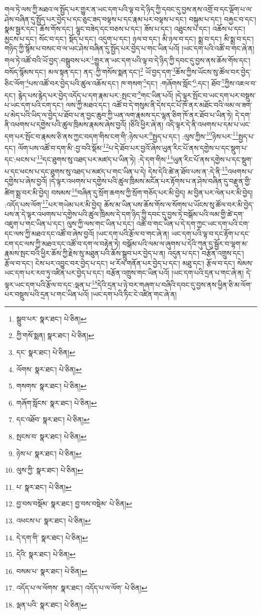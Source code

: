 གལ་ཏེ་ལས་ཀྱི་མཐའ་ལ་སྤྱོད་པར་གྱུར་ན་ཡང་དག་པའི་ལྟ་བ་དེ་ཉིད་ཀྱི་དབང་དུ་བྱས་ནས་འགྲོ་བ་དང་ལྡོག་པ་ལ་ཤེས་བཞིན་དུ་སྤྱོད་པར་བྱེད་པ་དང་ཅུང་ཟད་བལྟས་པ་དང་རྣམ་པར་བལྟས་པ་དང་། བསྐུམ་པ་དང་། བརྐྱང་བ་དང་། སྣམ་སྦྱར་དང་། ཆོས་གོས་དང་། ལྷུང་བཟེད་དང་བཅས་པ་དང་། ཟོས་པ་དང་། འཐུངས་པ་དང་། འཆོས་པ་དང་། མྱངས་པ་དང་། སོང་བ་དང་། སྡོད་པ་དང་། འདུག་པ་དང་། ཉལ་བ་དང་། མི་ཉལ་བ་དང་། སྨྲ་བ་དང་། མི་སྨྲ་བ་དང་། གཉིད་ཀྱི་སྙོམ་པ་བསང་བ་ལ་ཡང་ཤེས་བཞིན་དུ་སྤྱོད་པར་བྱེད་པ་གང་ཡིན་པའོ། །ཡང་དག་པའི་འཚོ་བ་གང་ཞེ་ན། གལ་ཏེ་འཚོ་བའི་ཡོ་བྱད་:བསྒྲུབས་པར་\footnote{སྒྲུབ་པར་  སྣར་ཐང་།  པེ་ཅིན། }གྱུར་ན་ཡང་དག་པའི་ལྟ་བ་དེ་ཉིད་ཀྱི་དབང་དུ་བྱས་ནས་ཆོས་གོས་དང་། བསོད་སྙོམས་དང་། མལ་སྟན་དང་། ནད་:ཀྱི་གསོས་སྨན་དང་།\footnote{ཀྱི་གསོ་སྨན།  སྣར་ཐང་།  པེ་ཅིན། } ཡོ་བྱད་དག་\footnote{དང་  སྣར་ཐང་།  པེ་ཅིན། }ཆོས་ཀྱིས་ཡོངས་སུ་ཚོལ་བར་བྱེད་ཅིང་ལོག་\footnote{ལོགས་  སྣར་ཐང་།  པེ་ཅིན། }པས་འཚོ་བར་བྱེད་པའི་ཚུལ་འཆོས་དང་། ཁ་གསག་\footnote{གསགས་  སྣར་ཐང་།  པེ་ཅིན། }དང་། :གཞོགས་སློང་\footnote{གཞོག་སློངས་  སྣར་ཐང་།  པེ་ཅིན། }:དང་། ཐོབ་\footnote{དང་འཐོབ་  སྣར་ཐང་།  པེ་ཅིན། }ཀྱིས་འཇལ་བ་དང་། རྙེད་པས་རྙེད་པར་བྱེད་འདོད་པ་དག་རྣམ་པར་:སྤང་བ་\footnote{སྤངས་བ་  སྣར་ཐང་།  པེ་ཅིན། }གང་ཡིན་པའོ། །དེ་ལྟར་སྤོང་བ་ཡང་དག་པར་བསྡུས་པ་ཡང་དག་པའི་ངག་དང་། ལས་ཀྱི་མཐའ་དང་། འཚོ་བ་དེ་གསུམ་ནི་དེས་དང་པོ་ཁོ་ནར་མཐོང་བའི་ལམ་ལ་ཟག་པ་མེད་པའི་ཡིད་ལ་བྱེད་པ་ཐོབ་པ་ན་བྱང་ཆུབ་ཀྱི་ཡན་ལག་རྣམས་དང་ལྷན་ཅིག་ཁོ་ནར་ཐོབ་པ་ཡིན་ཏེ། དེ་དག་ནི་འཕགས་པ་དགྱེས་པའི་ཚུལ་ཁྲིམས་རྣམས་ཞེས་བྱའོ། །ཅིའི་ཕྱིར་ཞེ་ན། འདི་ལྟར་དེ་ནི་འཕགས་པ་དམ་པ་ཡང་དག་པར་སྤོང་བ་རྣམས་ཅི་ནས་ཀྱང་བདག་གིས་ངག་གི་:ཉེས་པར་\footnote{ཉེས་པ་  སྣར་ཐང་།  པེ་ཅིན། }སྤྱད་པ་དང་། :ལུས་ཀྱིས་\footnote{ལུས་ཀྱི་  སྣར་ཐང་།  པེ་ཅིན། }ཉེས་པར་\footnote{པ་  སྣར་ཐང་།  པེ་ཅིན། }སྤྱད་པ་དང་། ལོག་པས་འཚོ་བ་དག་མི་:བྱ་བའི་སྡོམ་\footnote{བྱ་བས་བསྡོམ་  སྣར་ཐང་། བྱ་བས་བསྡེམ་  པེ་ཅིན། }པ་དེ་ཐོབ་པར་བྱའོ་ཞེས་ཡུན་རིང་པོ་ནས་དགྱེས་པ་དང་སྡུག་པ་དང་:ཕངས་པ་\footnote{འཕངས་པ་  སྣར་ཐང་།  པེ་ཅིན། }དང་ཐུགས་སུ་འཐད་པར་མཛད་པ་ཡིན་ཏེ། :དེ་དག་གིས་\footnote{དེ་དག་གི་  སྣར་ཐང་།  པེ་ཅིན། }ཡུན་རིང་པོ་ནས་དགྱེས་པ་དང་སྡུག་པ་དང་ཕངས་པ་དང་ཐུགས་སུ་འཐད་པ་མཛད་པ་གང་ཡིན་པ་དེ། དེས་དེའི་ཚེ་ན་ཐོབ་པས་ན་:དེ་ནི་\footnote{དེའི་  སྣར་ཐང་།  པེ་ཅིན། }འཕགས་པ་དགྱེས་པ་ཞེས་བྱའོ། །དེ་ལྟར་འཕགས་པ་དགྱེས་པའི་ཚུལ་ཁྲིམས་མངོན་པར་རྟོགས་པ་ན་ཤེས་བཞིན་དུ་བརྫུན་གྱི་ཚིག་སྨྲ་བར་མི་བྱེད། བསམས་\footnote{བསམ་པ་  སྣར་ཐང་།  པེ་ཅིན། }བཞིན་དུ་སྲོག་ཆགས་ཀྱི་སྲོག་གཅོད་པར་མི་བྱེད། མ་བྱིན་པར་ལེན་པར་མི་བྱེད། :འདོད་པས་ལོག་\footnote{འདོད་པ་ལ་ལོགས་  སྣར་ཐང་། འདོད་པ་ལ་ལོག་  པེ་ཅིན། }པར་གཡེམ་པར་མི་བྱེད། ཆོས་མ་ཡིན་པས་ཆོས་གོས་ལ་སོགས་པ་ཡོངས་སུ་ཚོལ་བར་མི་བྱེད་པས་ན་དེ་ལྟར་འཕགས་པ་དགྱེས་པའི་ཚུལ་ཁྲིམས་དེ་དག་ཉིད་ཀྱི་དབང་དུ་བྱས་ཏེ་བསྒོམ་པའི་ལམ་གྱི་ཚེ་དག་འཇུག་པ་གང་ཡིན་པ་དང་། ལུས་ཀྱི་ལས་གང་ཡིན་པ་དང་། འཚོ་བ་གང་ཡིན་པ་དེ་དག་ཀྱང་ཡང་དག་པའི་ངག་དང་ལས་ཀྱི་མཐའ་དང་འཚོ་བ་ཞེས་བྱའོ། །ཡང་དག་པའི་རྩོལ་བ་གང་ཞེ་ན། ཡང་དག་པའི་ལྟ་བ་དང་རྟོག་པ་དང་ངག་དང་ལས་ཀྱི་མཐའ་དང་འཚོ་བ་དག་ལ་བརྟེན་ཏེ། བསྒོམ་པའི་ལམ་ལ་ཞུགས་པ་དེའི་ཀུན་དུ་སྦྱོར་བ་ལྷག་མ་རྣམས་སྤང་བའི་ཕྱིར་ཆོས་ཀྱི་རྗེས་སུ་མཐུན་པའི་ཆོས་སྒྲུབ་པར་བྱེད་པ་ན། འདུན་པ་དང་། བརྩོན་འགྲུས་དང་། རྩོལ་བ་དང་། ངེས་པར་འབྱུང་བར་བྱེད་པ་དང་། ཕ་རོལ་གནོན་པར་བྱེད་པ་དང་། མཐུ་དང་། རྩོལ་བ་དང་། སེམས་ཡང་དག་པར་རབ་ཏུ་འཛིན་པར་བྱེད་པ་དང་། བརྩོན་འགྲུས་གང་ཡིན་པའོ། །ཡང་དག་པའི་དྲན་པ་གང་ཞེ་ན། དེ་ལྟར་ཡང་དག་པའི་རྩོལ་བ་དང་:ལྡན་པ་\footnote{ལྡན་པའི་  སྣར་ཐང་།  པེ་ཅིན། }དེའི་དྲན་པ་ཉེ་བར་གཞག་པ་བཞིའི་དབང་དུ་བྱས་ནས་ཕྱིན་ཅི་མ་ལོག་པར་བསྡུས་པའི་དྲན་པ་གང་ཡིན་པའོ། །ཡང་དག་པའི་ཏིང་ངེ་འཛིན་གང་ཞེ་ན། 